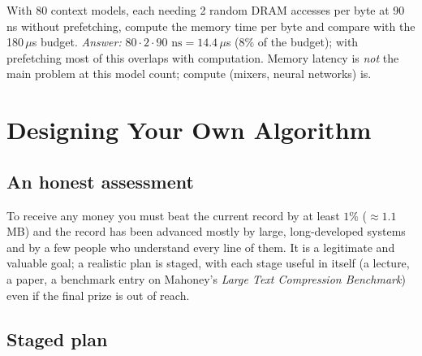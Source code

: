 \documentclass[11pt,a4paper,openany]{book}
\theoremstyle{definition}
\theoremstyle{remark}
\begin{document}
\begin{exercise}
With 80 context models, each needing 2 random DRAM accesses per byte at 90\,ns without prefetching, compute the memory time per byte and compare with the 180\,$\mu$s budget. \emph{Answer:} $80\cdot2\cdot90\text{ ns}=14.4\,\mu$s ($8\%$ of the budget); with prefetching most of this overlaps with computation. Memory latency is \emph{not} the main problem at this model count; compute (mixers, neural networks) is.
\end{exercise}

\chapter{Designing Your Own Algorithm}

\section{An honest assessment}

To receive any money you must beat the current record by at least $1\%$ ($\approx1.1$ MB) and the record has been advanced mostly by large, long-developed systems and by a few people who understand every line of them. It is a legitimate and valuable goal; a realistic plan is staged, with each stage useful in itself (a lecture, a paper, a benchmark entry on Mahoney's \emph{Large Text Compression Benchmark}) even if the final prize is out of reach.

\section{Staged plan}
\end{document}
